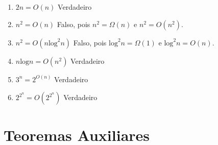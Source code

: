 \documentclass[12pt,a4paper,oneside]{article}
\begin{document}
\begin{enumerate}
	\begin{enumerate}
		\item $2n = O(n)$ \hspace{0.5cm} {\color{verde} Verdadeiro}
		\item $n^2 = O(n)$ \hspace{0.5cm} {\color{verde} Falso, pois $n^2 = \Omega(n)$ e $n^2 = O(n^2)$.}
		\item $n^2 = O(n \mbox{log}^2 n)$ \hspace{0.5cm} {\color{verde} Falso, pois $\mbox{log}^2 n = \Omega(1)$ e $\mbox{log}^2 n = O(n)$.}
		\item $n \mbox{log}n = O(n^2)$ \hspace{0.5cm} {\color{verde} Verdadeiro}
		\item $3^n = 2^{O(n)}$ \hspace{0.5cm} {\color{verde} Verdadeiro}
		\item $2^{2^{n}} = O(2^{2^{n}})$ \hspace{0.5cm} {\color{verde} Verdadeiro}
	\end{enumerate}
	
\end{enumerate}

\section*{Teoremas Auxiliares}
\end{document}
